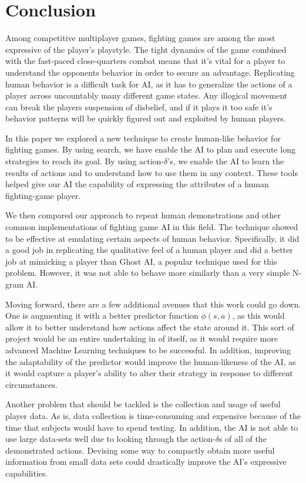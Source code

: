 
\chapter{Conclusion}

\label{Chapter6} %

Among competitive multiplayer games, fighting games are among the most expressive of the player's playstyle. The tight dynamics of the game combined with the fast-paced close-quarters combat means that it's vital for a player to understand the opponents behavior in order to secure an advantage. Replicating human behavior is a difficult task for AI, as it has to generalize the actions of a player across uncountably many different game states. Any illogical movement can break the players suspension of disbelief, and if it plays it too safe it's behavior patterns will be quickly figured out and exploited by human players.

In this paper we explored a new technique to create human-like behavior for fighting games. By using search, we have enable the AI to plan and execute long strategies to reach its goal. By using action-$\delta$'s, we enable the AI to learn the results of actions and to understand how to use them in any context. These tools helped give our AI the capability of expressing the attributes of a human fighting-game player.

We then compared our approach to repeat human demonstrations and other common implementations of fighting game AI in this field. The technique showed to be effective at emulating certain aspects of human behavior. Specifically, it did a good job in replicating the qualitative feel of a human player and did a better job at mimicking a player than Ghost AI, a popular technique used for this problem. However, it was not able to behave more similarly than a very simple N-gram AI.

Moving forward, there are a few additional avenues that this work could go down. One is augmenting it with a better predictor function $\phi(s,a)$, as this would allow it to better understand how actions affect the state around it. This sort of project would be an entire undertaking in of itself, as it would require more advanced Machine Learning techniques to be successful. In addition, improving the adaptability of the predictor would improve the human-likeness of the AI, as it would capture a player's ability to alter their strategy in response to different circumstances. 

Another problem that should be tackled is the collection and usage of useful player data. As is, data collection is time-consuming and expensive because of the time that subjects would have to spend testing. In addition, the AI is not able to use large data-sets well due to looking through the action-$\delta$s of all of the demonstrated actions. Devising some way to compactly obtain more useful information from small data sets could drastically improve the AI's expressive capabilities.